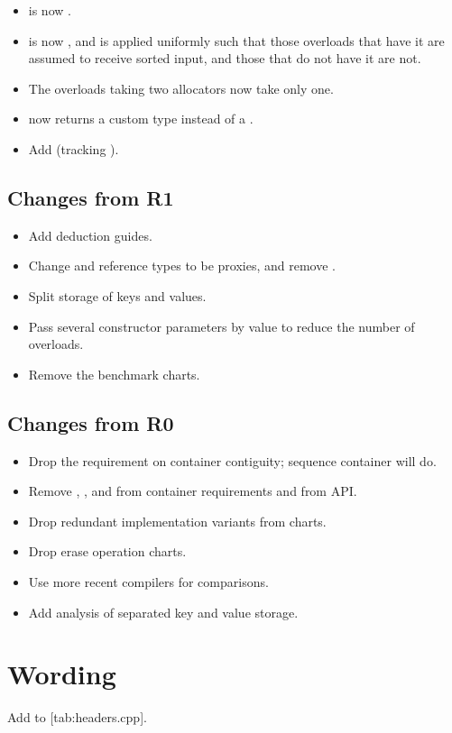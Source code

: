 \begin{itemize}
  \item {} is now .
  \item {} is now , and
    is applied uniformly such that those overloads that have it are assumed to
    receive sorted input, and those that do not have it are not.
  \item The overloads taking two allocators now take only one.
  \item {} now returns a custom type instead of a .
  \item Add  (tracking ).
\end{itemize}

\subsection{Changes from R1}

\begin{itemize}
  \item Add deduction guides.
  \item Change  and reference types to be proxies, and remove
    .
  \item Split storage of keys and values.
  \item Pass several constructor parameters by value to reduce the number of overloads.
  \item Remove the benchmark charts.
\end{itemize}

\subsection{Changes from R0}

\begin{itemize}
  \item Drop the requirement on container contiguity; sequence container will
    do.
  \item Remove , , and 
    from container requirements and from  API.
  \item Drop redundant implementation variants from charts.
  \item Drop erase operation charts.
  \item Use more recent compilers for comparisons.
  \item Add analysis of separated key and value storage.
\end{itemize}

\section{Wording}

Add  to [tab:headers.cpp].
